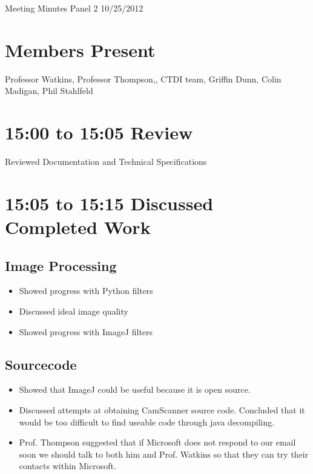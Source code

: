 \documentclass[]{article}
\begin{document}
	Meeting Minutes Panel 2 10/25/2012
	
	\section*{Members Present}
		Professor Watkins, Professor Thompson,, CTDI team, Griffin Dunn, Colin Madigan, Phil Stahlfeld
	\section*{15:00 to 15:05 Review}
		
		Reviewed Documentation and Technical Specifications \\
		
	\section*{15:05 to 15:15 Discussed Completed Work}
		
		\subsection*{Image Processing}
			\begin{itemize}
				\item Showed progress with Python filters
				\item Discussed ideal image quality
				\item Showed progress with ImageJ filters
			\end{itemize}
		
		\subsection*{Sourcecode}
			\begin{itemize}
				\item Showed that ImageJ could be useful because it is open source. \\
				\item Discussed attempts at obtaining CamScanner source code. Concluded that it would be too difficult to find useable code through java decompiling. \\
				\item Prof. Thompson suggested that if Microsoft does not respond to our email soon we should talk to both him and Prof. Watkins so that they can try their contacts within Microsoft. \\
			\end{itemize}
		
\end{document}
